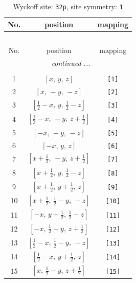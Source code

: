 \documentclass[fleqn,8pt]{jsarticle}
\begin{document}
\renewcommand{\arraystretch}{1.2}
\begin{longtable}{ccc}
\caption{Wyckoff site: {\tt 32p}, site symmetry: {\tt 1}}
 \\
 \hline \hline
No. & position & mapping \\ \hline \endfirsthead

\multicolumn{2}{l}{\tablename\ \thetable{}} \\
 \hline \hline
No. & position & mapping \\ \hline \endhead

 \hline \hline
\multicolumn{2}{r}{\footnotesize\it continued ...} \\ \endfoot

 \hline \hline
\multicolumn{2}{r}{} \\ \endlastfoot

1 & $\left[ x,\, y,\, z \right]$ & {\tt [1]} \\ \hline
2 & $\left[ x,\, - y,\, - z \right]$ & {\tt [2]} \\ \hline
3 & $\left[ \frac{1}{2} - x,\, y,\, \frac{1}{2} - z \right]$ & {\tt [3]} \\ \hline
4 & $\left[ \frac{1}{2} - x,\, - y,\, z + \frac{1}{2} \right]$ & {\tt [4]} \\ \hline
5 & $\left[ - x,\, - y,\, - z \right]$ & {\tt [5]} \\ \hline
6 & $\left[ - x,\, y,\, z \right]$ & {\tt [6]} \\ \hline
7 & $\left[ x + \frac{1}{2},\, - y,\, z + \frac{1}{2} \right]$ & {\tt [7]} \\ \hline
8 & $\left[ x + \frac{1}{2},\, y,\, \frac{1}{2} - z \right]$ & {\tt [8]} \\ \hline
9 & $\left[ x + \frac{1}{2},\, y + \frac{1}{2},\, z \right]$ & {\tt [9]} \\ \hline
10 & $\left[ x + \frac{1}{2},\, \frac{1}{2} - y,\, - z \right]$ & {\tt [10]} \\ \hline
11 & $\left[ - x,\, y + \frac{1}{2},\, \frac{1}{2} - z \right]$ & {\tt [11]} \\ \hline
12 & $\left[ - x,\, \frac{1}{2} - y,\, z + \frac{1}{2} \right]$ & {\tt [12]} \\ \hline
13 & $\left[ \frac{1}{2} - x,\, \frac{1}{2} - y,\, - z \right]$ & {\tt [13]} \\ \hline
14 & $\left[ \frac{1}{2} - x,\, y + \frac{1}{2},\, z \right]$ & {\tt [14]} \\ \hline
15 & $\left[ x,\, \frac{1}{2} - y,\, z + \frac{1}{2} \right]$ & {\tt [15]} \\ \hline

\end{longtable}
\end{document}
